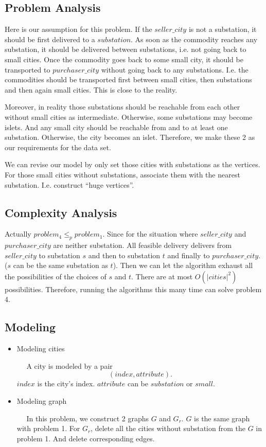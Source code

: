 \documentclass[11pt, a4paper]{article} %
\begin{document}
	\subsection{Problem Analysis}
	Here is our assumption for this problem. If the $seller\_city$ is not a substation, it should be first delivered to a $substation$. As soon as the commodity reaches any substation, it should be delivered between substations, i.e. not going back to small cities. Once the commodity goes back to some small city, it should be transported to $purchaser\_city$ without going back to any substations. I.e. the commodities should be transported first between small cities, then substations and then again small cities. This is close to the reality.\par
	Moreover, in reality those substations should be reachable from each other without small cities as intermediate. Otherwise, some substations may become islets. And any small city should be reachable from and to at least one substation. Otherwise, the city becomes an islet. Therefore, we make these 2 as our requirements for the data set.\par
	\indent We can revise our model by only set those cities with substations as the vertices. For those small cities without substations, associate them with the nearest substation. I.e. construct ``huge vertices''.
	
	\subsection{Complexity Analysis}
	Actually $problem_4\leq _pproblem_1$. Since for the situation where $seller\_city$ and $purchaser\_city$ are neither substation. All feasible delivery delivers from $seller\_city$ to substation $s$ and then to substation $t$ and finally to $purchaser\_city$. ($s$ can be the same substation as $t$). Then we can let the algorithm exhaust all the possibilities of the choices of $s$ and $t$. There are at most $O(|cities|^2)$ possibilities. Therefore, running the algorithms this many time can solve problem 4.
	
	\subsection{Modeling}
	\begin{itemize}
		\item Modeling cities\par
		$\quad$ A city is modeled by a pair $$(index, attribute).$$ $index$ is the city's index. $attribute$ can be $substation$ or $small$.
		
		\item Modeling graph\par
		$\quad$ In this problem, we construct 2 graphs $G$ and $G_r$. $G$ is the same graph with problem 1. For $G_r$, delete all the cities without substation from the $G$ in problem 1. And delete corresponding edges.
	\end{itemize}
	
\end{document}
